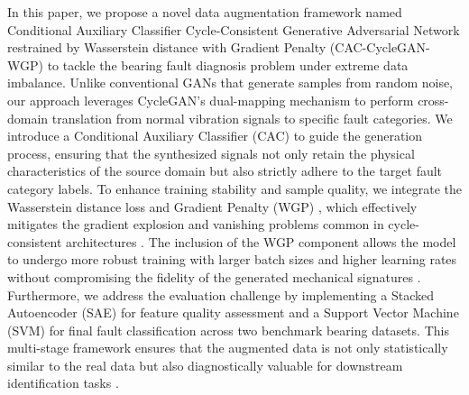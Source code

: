 In this paper, we propose a novel data augmentation framework named Conditional Auxiliary Classifier Cycle-Consistent Generative Adversarial Network restrained by Wasserstein distance with Gradient Penalty (CAC-CycleGAN-WGP) to tackle the bearing fault diagnosis problem under extreme data imbalance. Unlike conventional GANs that generate samples from random noise, our approach leverages CycleGAN's dual-mapping mechanism \cite{zhu2017cyclegan, fernandez2022cyclegan_bearing, zhu2017cyclegan} to perform cross-domain translation from normal vibration signals to specific fault categories. We introduce a Conditional Auxiliary Classifier (CAC) \cite{odena2017acgan, meng2022iacgan, odena2017acgan, meng2022iacgan} to guide the generation process, ensuring that the synthesized signals not only retain the physical characteristics of the source domain but also strictly adhere to the target fault category labels. To enhance training stability and sample quality, we integrate the Wasserstein distance loss and Gradient Penalty (WGP) \cite{gulrajani2017wgangp, han2020wgangp_bearing}, which effectively mitigates the gradient explosion and vanishing problems common in cycle-consistent architectures \cite{zhang2022cwgan_gp, li2022cwgan_gp_pca, zhang2022cwgan_gp}. The inclusion of the WGP component allows the model to undergo more robust training with larger batch sizes and higher learning rates without compromising the fidelity of the generated mechanical signatures \cite{gulrajani2017wgangp, li2021wgan_gp_fault}. Furthermore, we address the evaluation challenge by implementing a Stacked Autoencoder (SAE) \cite{hinton2006sae, shao2018sae_bearing, jia2016sae_bearing} for feature quality assessment and a Support Vector Machine (SVM) \cite{cortes1995svm, support2019svm_bearing, samanta2006svm_bearing} for final fault classification across two benchmark bearing datasets. This multi-stage framework ensures that the augmented data is not only statistically similar to the real data but also diagnostically valuable for downstream identification tasks \cite{shao2018sae_bearing, support2019svm_bearing}.

